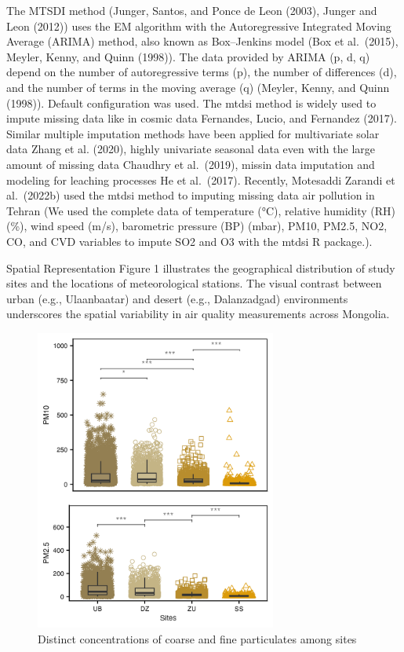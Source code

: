 \documentclass[
  11pt,
]{article}
\begin{document}
The MTSDI method (Junger, Santos, and Ponce de Leon (2003), Junger and
Leon (2012)) uses the EM algorithm with the Autoregressive Integrated
Moving Average (ARIMA) method, also known as Box--Jenkins model (Box et
al.~(2015), Meyler, Kenny, and Quinn (1998)). The data provided by ARIMA
(p, d, q) depend on the number of autoregressive terms (p), the number
of differences (d), and the number of terms in the moving average (q)
(Meyler, Kenny, and Quinn (1998)). Default configuration was used. The
mtdsi method is widely used to impute missing data like in cosmic data
Fernandes, Lucio, and Fernandez (2017). Similar multiple imputation
methods have been applied for multivariate solar data Zhang et al.
(2020), highly univariate seasonal data even with the large amount of
missing data Chaudhry et al.~(2019), missin data imputation and modeling
for leaching processes He et al.~(2017). Recently, Motesaddi Zarandi et
al.~(2022b) used the mtdsi method to imputing missing data air pollution
in Tehran (We used the complete data of temperature (°C), relative
humidity (RH) (\%), wind speed (m/s), barometric pressure (BP) (mbar),
PM10, PM2.5, NO2, CO, and CVD variables to impute SO2 and O3 with the
mtdsi R package.).

Spatial Representation Figure 1 illustrates the geographical
distribution of study sites and the locations of meteorological
stations. The visual contrast between urban (e.g., Ulaanbaatar) and
desert (e.g., Dalanzadgad) environments underscores the spatial
variability in air quality measurements across Mongolia.

\newpage

\begin{figure}
\centering
\includegraphics[width=3.125in,height=\textheight,keepaspectratio]{images/figure_3.png}
\caption{Distinct concentrations of coarse and fine particulates among
sites}
\end{figure}
\end{document}
